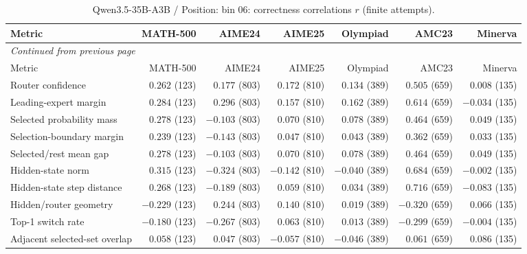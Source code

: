 \begingroup\scriptsize\setlength{\tabcolsep}{4pt}
\begin{longtable}{@{}lrrrrrr@{}}
\caption{Qwen3.5-35B-A3B / Position: bin 06: correctness correlations $r$ (finite attempts).}\label{tab:multi-qwen-position-bin_06}\\
\toprule
Metric & MATH-500 & AIME24 & AIME25 & Olympiad & AMC23 & Minerva \\
\midrule\endfirsthead
\multicolumn{7}{l}{\textit{Continued from previous page}}\\
\toprule
Metric & MATH-500 & AIME24 & AIME25 & Olympiad & AMC23 & Minerva \\
\midrule\endhead
\bottomrule\endfoot
Router confidence & $0.262$ (123) & $0.177$ (803) & $0.172$ (810) & $0.134$ (389) & $0.505$ (659) & $0.008$ (135) \\
Leading-expert margin & $0.284$ (123) & $0.296$ (803) & $0.157$ (810) & $0.162$ (389) & $0.614$ (659) & $-0.034$ (135) \\
Selected probability mass & $0.278$ (123) & $-0.103$ (803) & $0.070$ (810) & $0.078$ (389) & $0.464$ (659) & $0.049$ (135) \\
Selection-boundary margin & $0.239$ (123) & $-0.143$ (803) & $0.047$ (810) & $0.043$ (389) & $0.362$ (659) & $0.033$ (135) \\
Selected/rest mean gap & $0.278$ (123) & $-0.103$ (803) & $0.070$ (810) & $0.078$ (389) & $0.464$ (659) & $0.049$ (135) \\
Hidden-state norm & $0.315$ (123) & $-0.324$ (803) & $-0.142$ (810) & $-0.040$ (389) & $0.684$ (659) & $-0.002$ (135) \\
Hidden-state step distance & $0.268$ (123) & $-0.189$ (803) & $0.059$ (810) & $0.034$ (389) & $0.716$ (659) & $-0.083$ (135) \\
Hidden/router geometry & $-0.229$ (123) & $0.244$ (803) & $0.140$ (810) & $0.019$ (389) & $-0.320$ (659) & $0.066$ (135) \\
Top-1 switch rate & $-0.180$ (123) & $-0.267$ (803) & $0.063$ (810) & $0.013$ (389) & $-0.299$ (659) & $-0.004$ (135) \\
Adjacent selected-set overlap & $0.058$ (123) & $0.047$ (803) & $-0.057$ (810) & $-0.046$ (389) & $0.061$ (659) & $0.086$ (135) \\
\end{longtable}\endgroup

